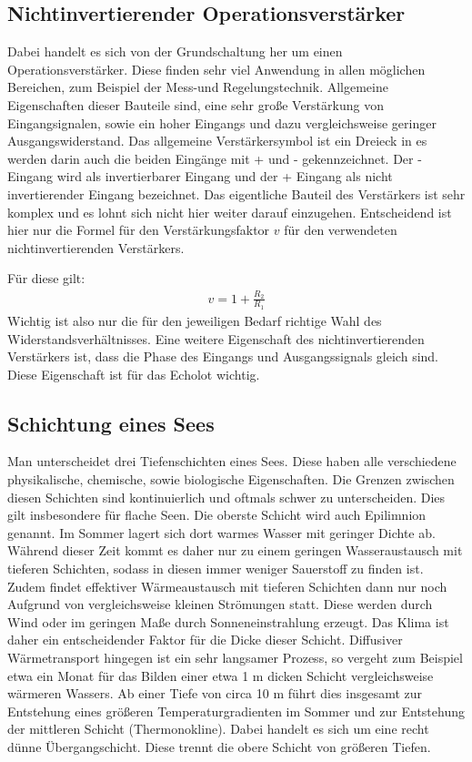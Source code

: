 \documentclass[12pt,a4paper,titlepage,headinclude,bibtotoc]{scrartcl}
\numberwithin{equation}{subsection}
\begin{document}
\subsection{Nichtinvertierender Operationsverstärker}
\label{sec:teoverstaerker}
Dabei handelt es sich von der Grundschaltung her um einen Operationsverstärker.
Diese finden sehr viel Anwendung in allen möglichen Bereichen, zum Beispiel der Mess-und Regelungstechnik. 
Allgemeine Eigenschaften dieser Bauteile sind, eine sehr große Verstärkung von Eingangsignalen, sowie ein hoher Eingangs und dazu vergleichsweise geringer Ausgangswiderstand.
Das allgemeine Verstärkersymbol ist ein Dreieck in es werden darin auch die beiden
Eingänge mit + und - gekennzeichnet.
Der - Eingang wird als invertierbarer Eingang und 
der + Eingang als nicht invertierender Eingang bezeichnet.
Das eigentliche Bauteil des Verstärkers ist sehr komplex und es lohnt sich nicht hier 
weiter darauf einzugehen.
Entscheidend ist hier nur die Formel für den Verstärkungsfaktor $v$ für den verwendeten 
nichtinvertierenden Verstärkers. 

Für diese gilt:
\begin{align}
 v = 1 + \frac{R_2}{R_1}\label{eq:verst}
\end{align}
Wichtig ist also nur die für den jeweiligen Bedarf richtige Wahl des Widerstandsverhältnisses.
Eine weitere Eigenschaft des nichtinvertierenden Verstärkers ist, dass die Phase des Eingangs und Ausgangssignals gleich sind.
Diese Eigenschaft ist für das Echolot wichtig.
\cite{op}

\subsection{Schichtung eines Sees}

Man unterscheidet drei Tiefenschichten eines Sees.
Diese haben alle verschiedene physikalische, chemische, sowie biologische Eigenschaften.
Die Grenzen zwischen diesen Schichten sind kontinuierlich und oftmals schwer zu unterscheiden. 
Dies gilt insbesondere für flache Seen.
Die oberste Schicht wird auch Epilimnion genannt. 
Im Sommer lagert sich dort warmes Wasser mit geringer Dichte ab.
Während dieser Zeit kommt es daher nur zu einem geringen Wasseraustausch mit tieferen Schichten, sodass in diesen immer weniger Sauerstoff zu finden ist.
Zudem findet effektiver Wärmeaustausch mit tieferen Schichten dann nur noch Aufgrund von vergleichsweise kleinen Strömungen statt.
Diese werden durch Wind oder im geringen Maße durch Sonneneinstrahlung erzeugt. 
Das Klima ist daher ein entscheidender Faktor für die Dicke dieser Schicht.
Diffusiver Wärmetransport hingegen ist ein sehr langsamer Prozess, so vergeht zum Beispiel etwa ein Monat für das Bilden einer etwa 1 m dicken Schicht vergleichsweise wärmeren Wassers.
Ab einer Tiefe von circa 10 m führt dies insgesamt zur Entstehung eines größeren Temperaturgradienten im Sommer und zur Entstehung der mittleren Schicht (Thermonokline).
Dabei handelt es sich um eine recht dünne Übergangschicht.
Diese trennt die obere Schicht von größeren Tiefen. 
\newline
\end{document}
